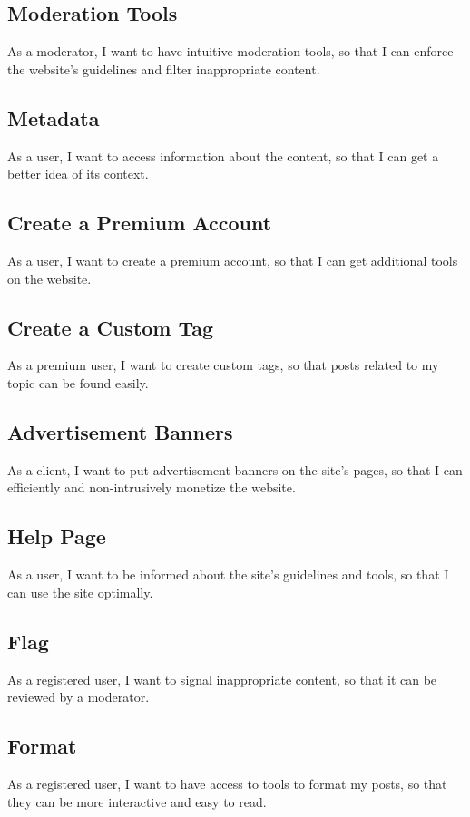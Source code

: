 \documentclass [a4paper, 11pt]{article}
\begin{document}
\subsection{Moderation Tools}
As a moderator, I want to have intuitive moderation tools, so that I can enforce the website's guidelines and filter inappropriate content.

\subsection{Metadata}
As a user, I want to access information about the content, so that I can get a better idea of its context.

\subsection{Create a Premium Account}
As a user, I want to create a premium account, so that I can get additional tools on the website.

\subsection{Create a Custom Tag}
As a premium user, I want to create custom tags, so that posts related to my topic can be found easily.

\subsection{Advertisement Banners}
As a client, I want to put advertisement banners on the site's pages, so that I can efficiently and non-intrusively monetize the website.

\subsection{Help Page}
As a user, I want to be informed about the site's guidelines and tools, so that I can use the site optimally.

\subsection{Flag}
As a registered user, I want to signal inappropriate content, so that it can be reviewed by a moderator.

\subsection{Format}
As a registered user, I want to have access to tools to format my posts, so that they can be more interactive and easy to read.
\end{document}
